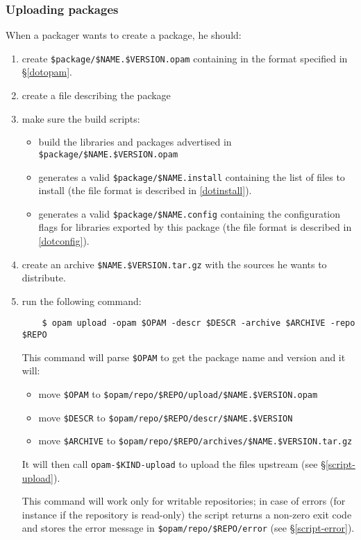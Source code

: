 \documentclass[a4paper,11pt]{article}
\begin{document}
\subsubsection{Uploading packages}
\label{opam-upload}

When a packager wants to create a package, he should:

\begin{enumerate}

\item create \verb+$package/$NAME.$VERSION.opam+ containing in the format
  specified in \S\ref{dotopam}.

\item create a file describing the package

\item make sure the build scripts:
\begin{itemize}
\item build the libraries and packages advertised in
  \verb+$package/$NAME.$VERSION.opam+
\item generates a valid \verb+$package/$NAME.install+ containing the
  list of files to install (the file format is described in
  \ref{dotinstall}).
\item generates a valid \verb+$package/$NAME.config+ containing the
  configuration flags for libraries exported by this package (the file
  format is described in \ref{dotconfig}).
\end{itemize}

\item create an archive \verb+$NAME.$VERSION.tar.gz+ with the sources he
  wants to distribute.

\item run the following command:

\begin{verbatim}
    $ opam upload -opam $OPAM -descr $DESCR -archive $ARCHIVE -repo $REPO
\end{verbatim}

This command will parse \verb+$OPAM+ to get the package name and
version and it will:
\begin{itemize}
\item move \verb+$OPAM+ to \verb+$opam/repo/$REPO/upload/$NAME.$VERSION.opam+
\item move \verb+$DESCR+ to \verb+$opam/repo/$REPO/descr/$NAME.$VERSION+
\item move \verb+$ARCHIVE+ to \verb+$opam/repo/$REPO/archives/$NAME.$VERSION.tar.gz+
\end{itemize}

It will then call \verb+opam-$KIND-upload+ to upload the files
upstream (see \S\ref{script-upload}).

This command will work only for writable repositories; in case of
errors (for instance if the repository is read-only) the script
returns a non-zero exit code and stores the error message in
\verb+$opam/repo/$REPO/error+ (see \S\ref{script-error}).

\end{enumerate}
\end{document}
